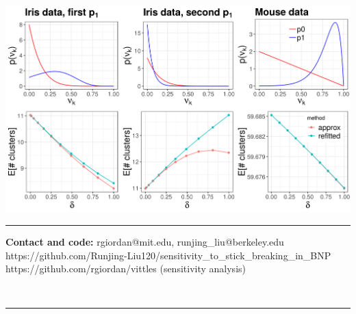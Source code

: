 \documentclass[a0,plainsections,30pt]{sciposter}\usepackage[]{graphicx}\usepackage[]{color}
\newenvironment{knitrout}{}{} %
\begin{document}
\begin{minipage}[t]{0.45\textwidth}
\begin{knitrout}
{\centering \includegraphics[width=0.98\linewidth,height=0.588\linewidth]{figure/functional_sens_plot-1} 

}



\end{knitrout}

\noindent\rule{0.95\textwidth}{1pt}

{\bf Contact and code: } rgiordan@mit.edu, runjing\_liu@berkeley.edu
{\color{blue} https://github.com/Runjing-Liu120/sensitivity\_to\_stick\_breaking\_in\_BNP}
{\color{blue} https://github.com/rgiordan/vittles}
(sensitivity analysis)

% 

\end{minipage}\\

\begin{center}
\noindent\rule{0.95\textwidth}{1pt}
\end{center}


\renewcommand{\section}[2]{}%
\footnotesize{
  
  
}
\end{document}
